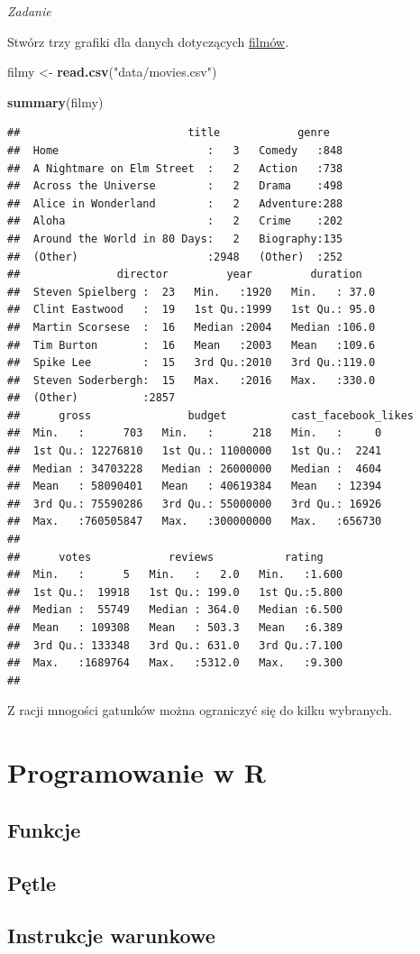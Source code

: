 \documentclass[]{book}
\newenvironment{Shaded}{\begin{snugshade}}{\end{snugshade}}
\newcommand{\KeywordTok}[1]{\textcolor[rgb]{0.13,0.29,0.53}{\textbf{#1}}}
\newcommand{\StringTok}[1]{\textcolor[rgb]{0.31,0.60,0.02}{#1}}
\newcommand{\NormalTok}[1]{#1}
\begin{document}
\emph{Zadanie}

Stwórz trzy grafiki dla danych dotyczących
\href{data/movies.csv}{filmów}.

\begin{Shaded}
\begin{Highlighting}[]
\NormalTok{filmy <-}\StringTok{ }\KeywordTok{read.csv}\NormalTok{(}\StringTok{"data/movies.csv"}\NormalTok{)}

\KeywordTok{summary}\NormalTok{(filmy)}
\end{Highlighting}
\end{Shaded}

\begin{verbatim}
##                          title            genre    
##  Home                       :   3   Comedy   :848  
##  A Nightmare on Elm Street  :   2   Action   :738  
##  Across the Universe        :   2   Drama    :498  
##  Alice in Wonderland        :   2   Adventure:288  
##  Aloha                      :   2   Crime    :202  
##  Around the World in 80 Days:   2   Biography:135  
##  (Other)                    :2948   (Other)  :252  
##               director         year         duration    
##  Steven Spielberg :  23   Min.   :1920   Min.   : 37.0  
##  Clint Eastwood   :  19   1st Qu.:1999   1st Qu.: 95.0  
##  Martin Scorsese  :  16   Median :2004   Median :106.0  
##  Tim Burton       :  16   Mean   :2003   Mean   :109.6  
##  Spike Lee        :  15   3rd Qu.:2010   3rd Qu.:119.0  
##  Steven Soderbergh:  15   Max.   :2016   Max.   :330.0  
##  (Other)          :2857                                 
##      gross               budget          cast_facebook_likes
##  Min.   :      703   Min.   :      218   Min.   :     0     
##  1st Qu.: 12276810   1st Qu.: 11000000   1st Qu.:  2241     
##  Median : 34703228   Median : 26000000   Median :  4604     
##  Mean   : 58090401   Mean   : 40619384   Mean   : 12394     
##  3rd Qu.: 75590286   3rd Qu.: 55000000   3rd Qu.: 16926     
##  Max.   :760505847   Max.   :300000000   Max.   :656730     
##                                                             
##      votes            reviews           rating     
##  Min.   :      5   Min.   :   2.0   Min.   :1.600  
##  1st Qu.:  19918   1st Qu.: 199.0   1st Qu.:5.800  
##  Median :  55749   Median : 364.0   Median :6.500  
##  Mean   : 109308   Mean   : 503.3   Mean   :6.389  
##  3rd Qu.: 133348   3rd Qu.: 631.0   3rd Qu.:7.100  
##  Max.   :1689764   Max.   :5312.0   Max.   :9.300  
## 
\end{verbatim}

Z racji mnogości gatunków można ograniczyć się do kilku wybranych.

\chapter{Programowanie w R}\label{programowanie-w-r}

\section{Funkcje}\label{funkcje}

\section{Pętle}\label{petle}

\section{Instrukcje warunkowe}\label{instrukcje-warunkowe}
\end{document}
